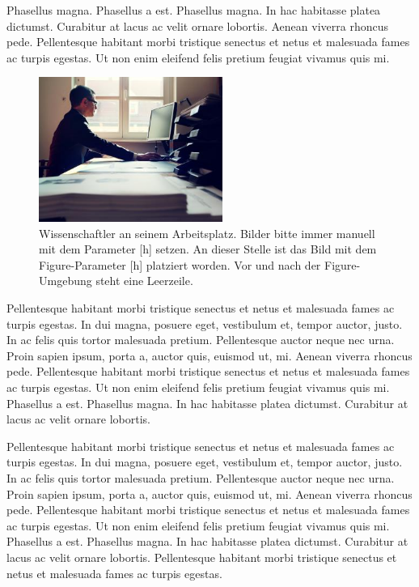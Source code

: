 Phasellus magna. Phasellus a est. Phasellus magna. In hac habitasse platea dictumst. Curabitur at lacus ac velit ornare lobortis. Aenean viverra rhoncus pede. Pellentesque habitant morbi tristique senectus et netus et malesuada fames ac turpis egestas. Ut non enim eleifend felis pretium feugiat vivamus quis mi. 

\begin{figure}[h]
	\centering
	\includegraphics[width=6cm]{Abbildungen/wissen.jpg}
	\caption[Wissenschaftler an seinem Arbeitsplatz.]{Wissenschaftler an seinem Arbeitsplatz. Bilder bitte immer manuell mit dem Parameter [h] setzen. An dieser Stelle ist das Bild mit dem Figure-Parameter [h] platziert worden. Vor und nach der Figure-Umgebung steht eine Leerzeile.}
	\label{fig:wissen}
\end{figure}

Pellentesque habitant morbi tristique senectus et netus et malesuada fames ac turpis egestas. In dui magna, posuere eget, vestibulum et, tempor auctor, justo. In ac felis quis tortor malesuada pretium. Pellentesque auctor neque nec urna. Proin sapien ipsum, porta a, auctor quis, euismod ut, mi. Aenean viverra rhoncus pede. Pellentesque habitant morbi tristique senectus et netus et malesuada fames ac turpis egestas. Ut non enim eleifend felis pretium feugiat vivamus quis mi. Phasellus a est. Phasellus magna. In hac habitasse platea dictumst. Curabitur at lacus ac velit ornare lobortis.

Pellentesque habitant morbi tristique senectus et netus et malesuada fames ac turpis egestas. In dui magna, posuere eget, vestibulum et, tempor auctor, justo. In ac felis quis tortor malesuada pretium. Pellentesque auctor neque nec urna. Proin sapien ipsum, porta a, auctor quis, euismod ut, mi. Aenean viverra rhoncus pede. Pellentesque habitant morbi tristique senectus et netus et malesuada fames ac turpis egestas. Ut non enim eleifend felis pretium feugiat vivamus quis mi. Phasellus a est. Phasellus magna. In hac habitasse platea dictumst. Curabitur at lacus ac velit ornare lobortis. Pellentesque habitant morbi tristique senectus et netus et malesuada fames ac turpis egestas.

